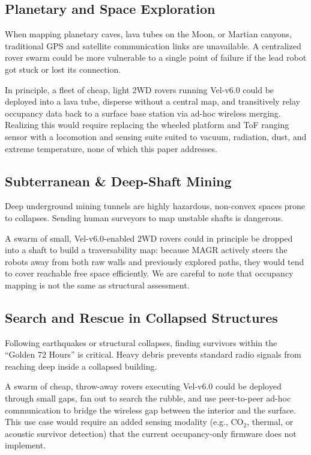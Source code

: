 \documentclass[journal,twoside]{IEEEtran}
\begin{document}
\subsection{Planetary and Space Exploration}
When mapping planetary caves, lava tubes on the Moon, or Martian canyons, traditional GPS and satellite communication links are unavailable. A centralized rover swarm could be more vulnerable to a single point of failure if the lead robot got stuck or lost its connection.

In principle, a fleet of cheap, light 2WD rovers running Vel-v6.0 could be deployed into a lava tube, disperse without a central map, and transitively relay occupancy data back to a surface base station via ad-hoc wireless merging. Realizing this would require replacing the wheeled platform and ToF ranging sensor with a locomotion and sensing suite suited to vacuum, radiation, dust, and extreme temperature, none of which this paper addresses.

\subsection{Subterranean \& Deep-Shaft Mining}
Deep underground mining tunnels are highly hazardous, non-convex spaces prone to collapses. Sending human surveyors to map unstable shafts is dangerous.

A swarm of small, Vel-v6.0-enabled 2WD rovers could in principle be dropped into a shaft to build a traversability map: because MAGR actively steers the robots away from both raw walls and previously explored paths, they would tend to cover reachable free space efficiently. We are careful to note that occupancy mapping is not the same as structural assessment.

\subsection{Search and Rescue in Collapsed Structures}
Following earthquakes or structural collapses, finding survivors within the ``Golden 72 Hours'' is critical. Heavy debris prevents standard radio signals from reaching deep inside a collapsed building.

A swarm of cheap, throw-away rovers executing Vel-v6.0 could be deployed through small gaps, fan out to search the rubble, and use peer-to-peer ad-hoc communication to bridge the wireless gap between the interior and the surface. This use case would require an added sensing modality (e.g., CO$_2$, thermal, or acoustic survivor detection) that the current occupancy-only firmware does not implement.
\end{document}

